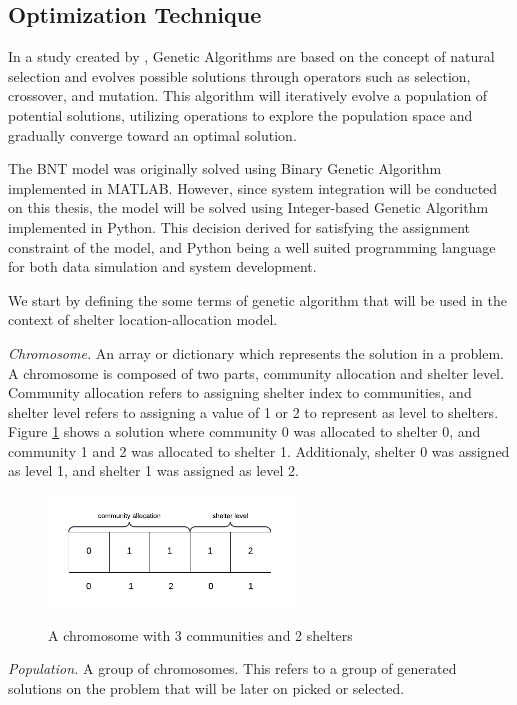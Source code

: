 \subsection{Optimization Technique}
	In a study created by \textcite{Mathew2012}, Genetic Algorithms are based on the concept of natural selection and evolves possible solutions through operators such as selection, crossover, and mutation. This algorithm will iteratively evolve a population of potential solutions, utilizing operations to explore the population space and gradually converge toward an optimal solution.
	
	The BNT model was originally solved using Binary Genetic Algorithm implemented in MATLAB. However, since system integration will be conducted on this thesis, the model will be solved using Integer-based Genetic Algorithm implemented in Python. This decision derived for satisfying the assignment constraint of the model, and Python being a well suited programming language for both data simulation and system development.
	
	We start by defining the some terms of genetic algorithm that will be used in the context of shelter location-allocation model.
	
	\textit{Chromosome.}  An array or dictionary which represents the  solution in a problem. A chromosome is composed of two parts, community allocation and shelter level. Community allocation refers to assigning shelter index to communities, and shelter level refers to assigning a value of 1 or 2 to represent as level to shelters. Figure \ref{Chromosome} shows a solution where community 0 was allocated to shelter 0, and community 1 and 2 was allocated to shelter 1. Additionaly, shelter 0 was assigned as level 1, and shelter 1 was assigned as level 2.
	
	\begin{figure}[h!]
		\caption{A chromosome with 3 communities and 2 shelters}
		\centering
		\includegraphics[width=250px]{Chromosome}
		\label{Chromosome}
	\end{figure}
	
	\textit{Population.} A group of chromosomes. This refers to a group of generated solutions on the problem that will be later on picked or selected.
	
